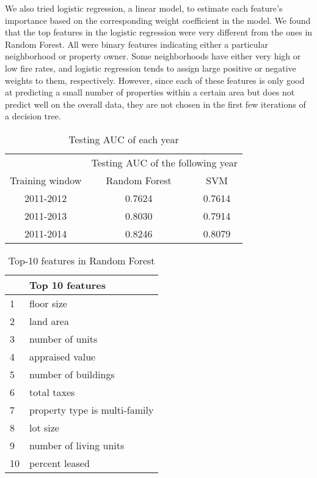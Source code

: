 \documentclass{sig-alternate-05-2015}
\begin{document}
{We also tried logistic regression, a linear model, to estimate each feature's importance based on the corresponding weight coefficient in the model. We found that the top features in the logistic regression were very different from the ones in Random Forest. All were binary features indicating either a particular neighborhood or property owner. Some neighborhoods have either very high or low fire rates, and logistic regression tends to assign large positive or negative weights to them, respectively. However, since each of these features is only good at predicting a small number of properties within a certain area but does not predict well on the overall data, they are not chosen in the first few iterations of a decision tree.


\begin{table}
\small
\sffamily
\centering
\begin{tabular}{ccc}
\toprule
& \multicolumn{2}{c}{Testing AUC of the following year} \\
\cmidrule{2-3} 
Training window    & Random Forest & SVM  \\ 
\midrule
2011-2012       & 0.7624   & 0.7614       \\  
2011-2013       & 0.8030   & 0.7914        \\  
2011-2014       & 0.8246   & 0.8079        \\  
\bottomrule
\end{tabular}
\caption{Testing AUC of each year}
\label{table:split}
\end{table}


\begin{table}
\small
\sffamily
\centering
\begin{tabular}{ll}
\toprule
  & Top 10 features  \\
\midrule
1   & floor size     \\
2   & land area       \\
3   & number of units          \\
4   & appraised value            \\
5   & number of buildings              \\
6   & total taxes             \\
7   & property type is multi-family             \\
8   & lot size             \\
9   & number of living units             \\
10  & percent leased             \\
\bottomrule
\end{tabular}
\caption{Top-10 features in Random Forest}
\label{table:top_features}
\end{table}

}
\end{document}
